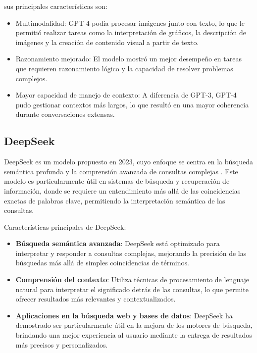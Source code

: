 sus principales características son:

\begin{itemize}
    \item Multimodalidad: GPT-4 podía procesar imágenes junto con texto, lo que le permitió realizar tareas como la interpretación de gráficos, la descripción de imágenes y la creación de contenido visual a partir de texto.
    \item Razonamiento mejorado: El modelo mostró un mejor desempeño en tareas que requieren razonamiento lógico y la capacidad de resolver problemas complejos.
    \item Mayor capacidad de manejo de contexto: A diferencia de GPT-3, GPT-4 pudo gestionar contextos más largos, lo que resultó en una mayor coherencia durante conversaciones extensas.    
\end{itemize}


\subsection{DeepSeek}
DeepSeek es un modelo propuesto en 2023, cuyo enfoque se centra en la búsqueda semántica profunda y la comprensión avanzada de consultas complejas \cite{deepseekai2024deepseekllmscalingopensource}. 
Este modelo es particularmente útil en sistemas de búsqueda y recuperación de información, donde se requiere un entendimiento más allá de las coincidencias exactas de palabras clave, permitiendo la interpretación semántica de las consultas.

Características principales de DeepSeek:
\begin{itemize}
    \item \textbf{Búsqueda semántica avanzada}: DeepSeek está optimizado para interpretar y responder a consultas complejas, mejorando la precisión de las búsquedas más allá de simples coincidencias de términos.
    \item \textbf{Comprensión del contexto}: Utiliza técnicas de procesamiento de lenguaje natural para interpretar el significado detrás de las consultas, lo que permite ofrecer resultados más relevantes y contextualizados.
    \item \textbf{Aplicaciones en la búsqueda web y bases de datos}: DeepSeek ha demostrado ser particularmente útil en la mejora de los motores de búsqueda, brindando una mejor experiencia al usuario mediante la entrega de resultados más precisos y personalizados.
\end{itemize}

